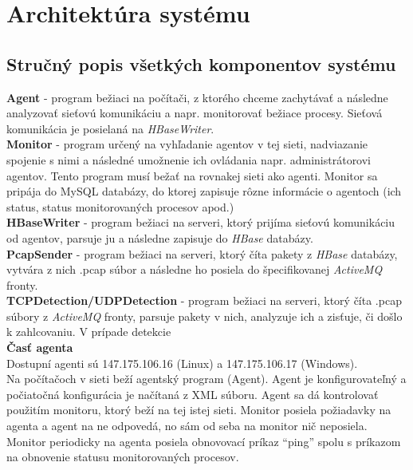 \documentclass[a4paper,12pt]{article}
\begin{document}
\section{Architektúra systému}
\subsection{Stručný popis všetkých komponentov systému}
\textbf{Agent} - program bežiaci na počítači, z ktorého chceme zachytávať a následne analyzovať sieťovú komunikáciu a napr. monitorovať bežiace procesy. Sieťová komunikácia je posielaná na \textit{HBaseWriter}. \\

\noindent \textbf{Monitor} - program určený na vyhľadanie agentov v tej sieti, nadviazanie spojenie s nimi a následné umožnenie ich ovládania napr. administrátorovi agentov. Tento program musí bežať na rovnakej sieti ako agenti. Monitor sa pripája do MySQL databázy, do ktorej zapisuje rôzne informácie o agentoch (ich status, status monitorovaných procesov apod.) \\

\noindent \textbf{HBaseWriter} - program bežiaci na serveri, ktorý prijíma sieťovú komunikáciu od agentov, parsuje ju a následne zapisuje do \textit{HBase} databázy. \\

\noindent \textbf{PcapSender} - program bežiaci na serveri, ktorý číta pakety z \textit{HBase} databázy, vytvára z nich .pcap súbor a následne ho posiela do špecifikovanej \textit{ActiveMQ} fronty. \\

\noindent \textbf{TCPDetection/UDPDetection} - program bežiaci na serveri, ktorý číta .pcap súbory z \textit{ActiveMQ} fronty, parsuje pakety v nich, analyzuje ich a zisťuje, či došlo k zahlcovaniu. V prípade detekcie \\

\noindent \textbf{Časť agenta} \\
Dostupní agenti sú 147.175.106.16 (Linux) a 147.175.106.17 (Windows). \\

Na počítačoch v sieti beží agentský program (Agent). Agent je konfigurovateľný a počiatočná konfigurácia je načítaná z XML súboru. Agent sa dá kontrolovať použitím monitoru, ktorý beží  na tej istej sieti. Monitor posiela požiadavky na agenta a agent na ne odpovedá, no sám od seba na monitor nič neposiela. Monitor periodicky na agenta posiela obnovovací príkaz “ping” spolu s príkazom na obnovenie statusu monitorovaných procesov. \\
\end{document}
